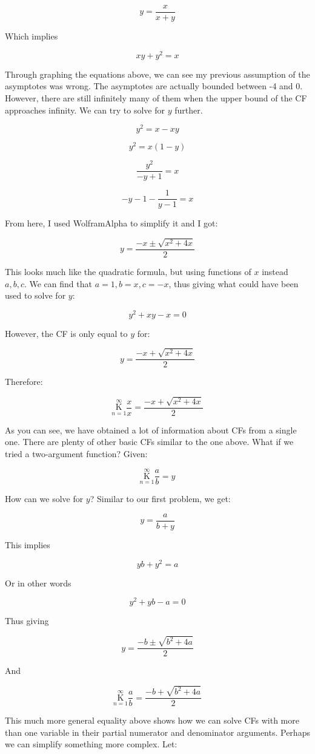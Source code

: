 \documentclass{article}
\begin{document}
$$y=\frac{x}{x+y}$$

Which implies

$$xy+y^2=x$$

Through graphing the equations above, we can see my previous assumption of the asymptotes was wrong. The asymptotes are actually bounded between -4 and 0. However, there are still infinitely many of them when the upper bound of the CF approaches infinity. We can try to solve for $y$ further.

$$y^2=x-xy$$

$$y^2=x(1-y)$$

$$\frac{y^2}{-y+1}=x$$

$$-y-1-\frac{1}{y-1}=x$$

From here, I used WolframAlpha to simplify it and I got:

$$y=\frac{-x \pm \sqrt{x^2+4x}}{2}$$

This looks much like the quadratic formula, but using functions of $x$ instead $a,b,c$. We can find that $a=1,b=x,c=-x$, thus giving what could have been used to solve for $y$:

$$y^2+xy-x=0$$

However, the CF is only equal to $y$ for:

$$y=\frac{-x + \sqrt{x^2+4x}}{2}$$

Therefore:

$$\underset{n=1}{\overset{\infty}{\mathrm K}} \frac{x}{x}=\frac{-x + \sqrt{x^2+4x}}{2}$$

As you can see, we have obtained a lot of information about CFs from a single one. There are plenty of other basic CFs similar to the one above. What if we tried a two-argument function? Given:

$$\underset{n=1}{\overset{\infty}{\mathrm K}} \frac{a}{b} = y$$

How can we solve for $y$? Similar to our first problem, we get:

$$y=\frac{a}{b + y}$$

This implies

$$yb+y^2=a$$

Or in other words

$$y^2+yb-a=0$$

Thus giving

$$y=\frac{-b \pm \sqrt{b^2+4a}}{2}$$

And

$$\underset{n=1}{\overset{\infty}{\mathrm K}} \frac{a}{b} = \frac{-b + \sqrt{b^2+4a}}{2}$$

This much more general equality above shows how we can solve CFs with more than one variable in their partial numerator and denominator arguments. Perhaps we can simplify something more complex. Let:
\end{document}
